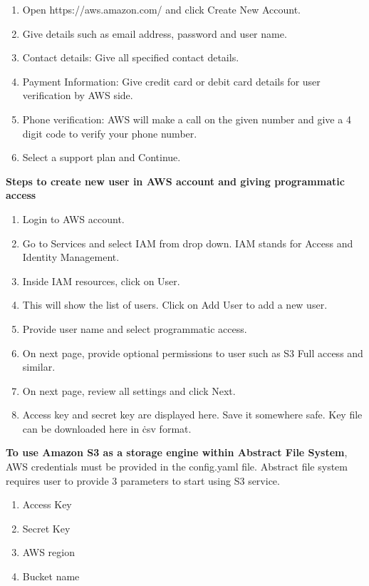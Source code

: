 \begin{enumerate}
    \item Open https://aws.amazon.com/ and click Create New Account.
    \item Give details such as email address, password and user name.
    \item Contact details: Give all specified contact details.
    \item Payment Information: Give credit card or debit card details for user
verification by AWS side.
    \item       Phone verification: AWS will make a call on the given number
and give a 4 digit code to verify your phone number.
    \item Select a support plan and Continue.
\end{enumerate}


\textbf{Steps to create new user in AWS account and giving programmatic access}


\begin{enumerate}
    \item Login to AWS account.
    \item Go to Services and select IAM from drop down. 
	IAM stands for Access and Identity Management.
    \item Inside IAM resources, click on User.
    \item This will show the list of users. Click on Add User to add a new 
user.
    \item Provide user name and select programmatic access.
    \item On next page, provide optional permissions to user such as S3 Full
access and similar.
    \item On next page, review all settings and click Next.
    \item Access key and secret key are displayed here. Save it somewhere safe.
Key file can be downloaded here in \.csv format.
\end{enumerate}



\textbf{To use Amazon S3 as a storage engine within Abstract File System}, AWS
credentials must be provided in the config.yaml file.
Abstract file system requires user to provide 3 parameters to start using S3
service.
\begin{enumerate}
 \item  Access Key
 \item  Secret Key
 \item  AWS region
 \item  Bucket name
\end{enumerate}


